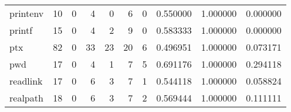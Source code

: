 \begin{tabular}{lrrrrrrrrr}
printenv  &                                       10 &                                                  0 &                                                  4 &                                                  0 &                                                  6 &                                                  0 &                                           0.550000 &                               1.000000 &                             0.000000 \\
printf    &                                       15 &                                                  0 &                                                  4 &                                                  2 &                                                  9 &                                                  0 &                                           0.583333 &                               1.000000 &                             0.000000 \\
ptx       &                                       82 &                                                  0 &                                                 33 &                                                 23 &                                                 20 &                                                  6 &                                           0.496951 &                               1.000000 &                             0.073171 \\
pwd       &                                       17 &                                                  0 &                                                  4 &                                                  1 &                                                  7 &                                                  5 &                                           0.691176 &                               1.000000 &                             0.294118 \\
readlink  &                                       17 &                                                  0 &                                                  6 &                                                  3 &                                                  7 &                                                  1 &                                           0.544118 &                               1.000000 &                             0.058824 \\
realpath  &                                       18 &                                                  0 &                                                  6 &                                                  3 &                                                  7 &                                                  2 &                                           0.569444 &                               1.000000 &                             0.111111 \\

\end{tabular}

